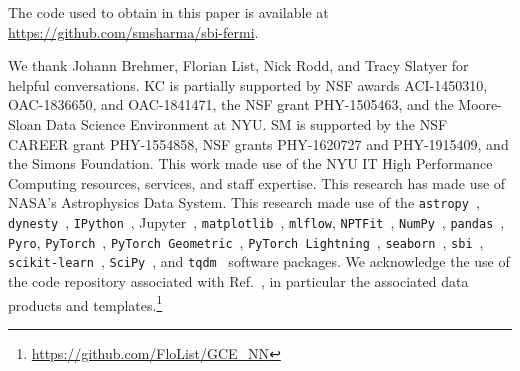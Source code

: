 \documentclass[prd,aps,10pt,nofootinbib,twocolumn,superscriptaddress,preprintnumbers,balancelastpage,longbibliography]{revtex4-1}
\begin{document}
The code used to obtain in this paper is available at \url{https://github.com/smsharma/sbi-fermi}.

\vspace{.3cm}

\begin{acknowledgments}

We thank Johann Brehmer, Florian List, Nick Rodd, and Tracy Slatyer for helpful conversations.  
KC is partially supported by NSF awards ACI-1450310, OAC-1836650, and OAC-1841471, the NSF grant PHY-1505463, and the Moore-Sloan Data Science Environment at NYU. 
SM is supported by the NSF CAREER grant PHY-1554858, NSF grants PHY-1620727 and PHY-1915409, and the Simons Foundation. 
This work made use of the NYU IT High Performance Computing resources, services, and staff expertise. 
This research has made use of NASA's Astrophysics Data System. 
This research made use of the \texttt{astropy}~\cite{Price-Whelan:2018hus,Robitaille:2013mpa}, \texttt{dynesty}~\cite{Speagle_2020}, \texttt{IPython}~\cite{PER-GRA:2007}, Jupyter~\cite{Kluyver2016JupyterN}, \texttt{matplotlib}~\cite{Hunter:2007}, \texttt{mlflow}, \texttt{NPTFit}~\cite{Mishra-Sharma:2016gis}, \texttt{NumPy}~\cite{harris2020array}, \texttt{pandas}~\cite{pandas:2010}, \texttt{Pyro}, \texttt{PyTorch}~\cite{NEURIPS2019_9015}, \texttt{PyTorch Geometric}~\cite{Fey/Lenssen/2019}, \texttt{PyTorch Lightning}~\cite{william_falcon_2020_3828935}, \texttt{seaborn}~\cite{seaborn}, \texttt{sbi}~\cite{tejero-cantero2020sbi}, \texttt{scikit-learn}~\cite{scikit-learn}, \texttt{SciPy}~\cite{2020SciPy-NMeth}, and \texttt{tqdm}~\cite{da2019tqdm}  software packages. We acknowledge the use of the code repository associated with Ref.~\cite{List:2020mzd}, in particular the associated data products and templates.\footnote{\url{https://github.com/FloList/GCE_NN}}
\end{acknowledgments}





\end{document}
